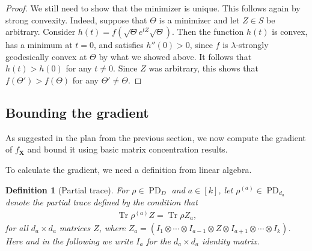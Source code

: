 \documentclass{article}
\newtheorem{definition}{Definition}
\DeclarePairedDelimiter{\norm}{\lVert}{\rVert}
\newcommand{\ot}{\otimes}
\renewcommand{\vec}{\bm}
\newcommand\PD{\operatorname{PD}}
\newcommand\tr{\operatorname{Tr}}
\newcommand{\MW}[1]{{\color{red}[MW: #1]}}
\begin{document}
\begin{proof}
We still need to show that the minimizer is unique.
This follows again by strong convexity.
Indeed, suppose that $\Theta$ is a minimizer and let $Z\in S$ be arbitrary.
Consider $h(t) = f(\sqrt\Theta e^{tZ} \sqrt\Theta)$.
Then the function $h(t)$ is convex, has a minimum at $t=0$, and satisfies $h''(0) > 0$, since $f$ is $\lambda$-strongly geodesically convex at $\Theta$ by what we showed above.
It follows that $h(t) > h(0)$ for any $t\neq0$.
Since $Z$ was arbitrary, this shows that $f(\Theta') > f(\Theta)$ for any $\Theta'\neq\Theta$.
\end{proof}

\subsection{Bounding the gradient}
As suggested in the plan from the previous section, we now compute the gradient of $f_{\vec X}$ and bound it using basic matrix concentration results.

To calculate the gradient, we need a definition from linear algebra.

\begin{definition}[Partial trace]\label{def:single marginal}
For $\rho \in \PD_D$ and $a\in[k]$, let $\rho^{(a)} \in \PD_{d_a}$ denote the \emph{partial trace} defined by the condition that
\begin{align*}
  \tr \rho^{(a)} Z = \tr \rho Z_a,
\end{align*}
for all $d_a \times d_a$ matrices $Z$, where $Z_a = (I_1 \ot \cdots \ot I_{a-1} \ot Z \ot I_{a+1} \ot \cdots \ot I_k)$.
Here and in the following we write $I_a$ for the $d_a\times d_a$ identity matrix.
\end{definition}

\end{document}
